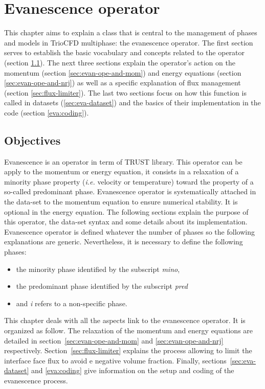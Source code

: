 \chapter{Evanescence operator}\label{sec:evanescence}
This chapter aims to explain a class that is central to the management of phases and models in TrioCFD multiphase: the evanescence operator. The first section serves to establish the basic vocabulary and concepts related to the operator (section \ref{eva:obj}). The next three sections explain the operator's action on the momentum (section \ref{sec:evan-ope-and-mom}) and energy equations (section \ref{sec:evan-ope-and-nrj}) as well as a specific explanation of flux management (section \ref{sec:flux-limiter}). The last two sections focus on how this function is called in datasets (\ref{sec:eva-dataset}) and the basics of their implementation in the code (section \ref{eva:coding}).
\section{Objectives}\label{eva:obj}

Evanescence is an operator in term of TRUST library. This operator can be apply to the momentum or energy equation, it consists in a relaxation of a minority phase property (\textit{i.e.} velocity or temperature) toward the property of a so-called predominant phase. 
Evanescence operator is systematically attached in the data-set to the momentum equation to ensure numerical stability.
It is optional in the energy equation. 
The following sections explain the purpose of this operator, the data-set syntax and some details about its implementation. Evanescence operator is defined whatever the number of phases so the following explanations are generic. Nevertheless, it is necessary to define the following phases:
\begin{itemize}
    \item the minority phase identified by the subscript \textit{mino},
    \item the predominant phase identified by the subscript \textit{pred} 
    \item and \textit{i} refers to a non-specific phase.
\end{itemize} 
This chapter deals with all the aspects link to the evanescence operator. It is organized as follow. The relaxation of the momentum and energy equations are detailed in section~\ref{sec:evan-ope-and-mom} and \ref{sec:evan-ope-and-nrj} respectively. Section~\ref{sec:flux-limiter} explains the process allowing to limit the interface face flux to avoid e negative volume fraction. Finally, sections~\ref{sec:eva-dataset} and \ref{eva:coding} give information on the setup and coding of the evanescence process.

